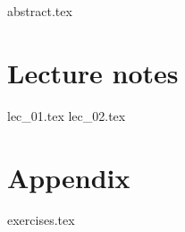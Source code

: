 \documentclass[fancyfoot, git]{mkessler-script}
\author{Simon Cyrani}
\begin{document}
\maketitle

{abstract.tex}

\cleardoublepage
\tableofcontents

\cleardoublepage
\summaryoflectures

\cleardoublepage
\part{Lecture notes}
{lec_01.tex}
{lec_02.tex}


\cleardoublepage
\appendix
\part{Appendix}

{exercises.tex}

\cleardoublepage

\cleardoublepage
\printvocabindex

\cleardoublepage
\printimageattributions

\cleardoublepage
\printliterature
\end{document}
